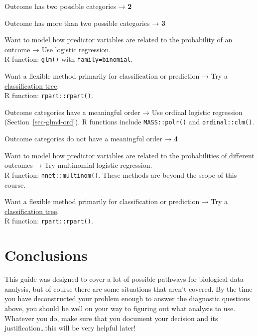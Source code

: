 \documentclass[
  13,
  letterpaper,
]{report}
\providecommand{\tightlist}{%
  \setlength{\itemsep}{0pt}\setlength{\parskip}{0pt}}
\begin{document}
\begin{description}
\tightlist
\item[\textbf{1.}]
Outcome has two possible categories → \textbf{2}
\item[\textbf{1′.}]
Outcome has more than two possible categories → \textbf{3}
\item[\textbf{2.}]
Want to model how predictor variables are related to the probability of
an outcome → Use \href{@sec-glm4-logistic}{logistic regression}.\\
R function: \texttt{glm()} with \texttt{family=binomial}.
\item[\textbf{2′.}]
Want a flexible method primarily for classification or prediction → Try
a \href{@sec-glm4-cart}{classification tree}.\\
R function: \texttt{rpart::rpart()}.
\item[\textbf{3.}]
Outcome categories have a meaningful order → Use ordinal logistic
regression (Section~\ref{sec-glm4-ord}). R functions include
\texttt{MASS::polr()} and \texttt{ordinal::clm()}.
\item[\textbf{3′.}]
Outcome categories do not have a meaningful order → \textbf{4}
\item[\textbf{4.}]
Want to model how predictor variables are related to the probabilities
of different outcomes → Try multinomial logistic regression.\\
R function: \texttt{nnet::multinom()}. These methods are beyond the
scope of this course.
\item[\textbf{4′.}]
Want a flexible method primarily for classification or prediction → Try
a \href{@sec-glm4-cart}{classification tree}.\\
R function: \texttt{rpart::rpart()}.
\end{description}

\section{Conclusions}\label{sec-plan-conc}

This guide was designed to cover a lot of possible pathways for
biological data analysis, but of course there are some situations that
aren't covered. By the time you have deconstructed your problem enough
to answer the diagnostic questions above, you should be well on your way
to figuring out what analysis to use. Whatever you do, make sure that
you document your decision and its justification\ldots this will be very
helpful later!
\end{document}
